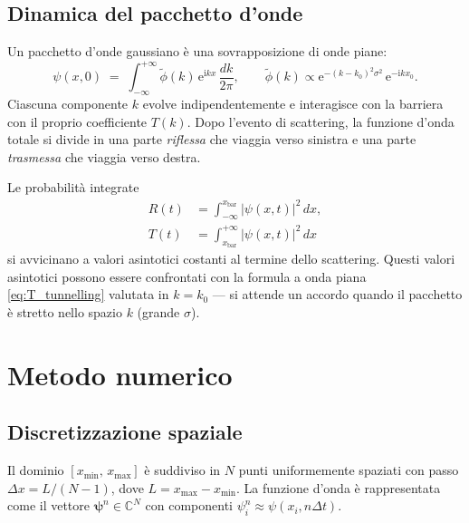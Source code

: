 \documentclass[12pt, a4paper]{article}
\newcommand{\dt}{\Delta t}
\newcommand{\dx}{\Delta x}
\newcommand{\ii}{\mathrm{i}}          %
\newcommand{\ee}{\mathrm{e}}          %
\begin{document}
\subsection{Dinamica del pacchetto d'onde}

Un pacchetto d'onde gaussiano è una sovrapposizione di onde piane:
\begin{equation}
  \psi(x,0) \;=\; \int_{-\infty}^{+\infty}
  \tilde{\phi}(k)\,\ee^{\ii kx}\,\frac{dk}{2\pi},
  \qquad
  \tilde{\phi}(k) \propto \ee^{-(k-k_0)^2\sigma^2}\,\ee^{-\ii k x_0}.
\end{equation}
Ciascuna componente $k$ evolve indipendentemente e interagisce con la barriera
con il proprio coefficiente $T(k)$. Dopo l'evento di scattering, la funzione
d'onda totale si divide in una parte \emph{riflessa} che viaggia verso sinistra
e una parte \emph{trasmessa} che viaggia verso destra.

Le probabilità integrate
\begin{align}
  R(t) &= \int_{-\infty}^{x_\text{bar}} |\psi(x,t)|^2\,dx, \\
  T(t) &= \int_{x_\text{bar}}^{+\infty} |\psi(x,t)|^2\,dx
\end{align}
si avvicinano a valori asintotici costanti al termine dello scattering.
Questi valori asintotici possono essere confrontati con la formula a
onda piana \eqref{eq:T_tunnelling} valutata in $k = k_0$ — si attende
un accordo quando il pacchetto è stretto nello spazio $k$ (grande $\sigma$).

\section{Metodo numerico}

\subsection{Discretizzazione spaziale}

Il dominio $[x_\text{min},\, x_\text{max}]$ è suddiviso in $N$ punti
uniformemente spaziati con passo $\dx = L/(N-1)$, dove $L =
x_\text{max} - x_\text{min}$. La funzione d'onda è rappresentata come
il vettore $\boldsymbol{\psi}^n \in \mathbb{C}^N$ con componenti
$\psi_i^n \approx \psi(x_i, n\dt)$.
\end{document}

